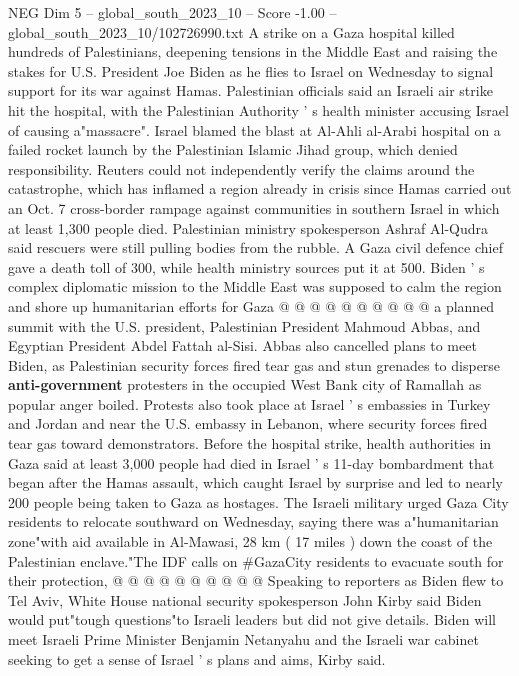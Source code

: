 \begin{textsample}{NEG Dim 5 – global\_south\_2023\_10 – Score -1.00 – global\_south\_2023\_10/102726990.txt}  \label{ex:f5_neg_065}
A strike on a Gaza hospital killed hundreds of Palestinians, deepening tensions in the Middle East and raising the stakes for U.S.
President Joe Biden as he flies to Israel on Wednesday to signal support for its war against Hamas.
Palestinian officials said an Israeli air strike hit the hospital, with the Palestinian Authority ' s health minister accusing Israel of causing a"massacre".
Israel blamed the blast at Al-Ahli al-Arabi hospital on a failed rocket launch by the Palestinian Islamic Jihad group, which denied responsibility.
Reuters could not independently verify the claims around the catastrophe, which has inflamed a region already in crisis since Hamas carried out an Oct. 7 cross-border rampage against communities in southern Israel in which at least 1,300 people died.
Palestinian ministry spokesperson Ashraf Al-Qudra said rescuers were still pulling bodies from the rubble.
A Gaza civil defence chief gave a death toll of 300, while health ministry sources put it at 500.
Biden ' s complex diplomatic mission to the Middle East was supposed to calm the region and shore up humanitarian efforts for Gaza @ @ @ @ @ @ @ @ @ @ a planned summit with the U.S. president, Palestinian President Mahmoud Abbas, and Egyptian President Abdel Fattah al-Sisi.
Abbas also cancelled plans to meet Biden, as Palestinian security forces fired tear gas and stun grenades to disperse \textbf{anti-government} protesters in the occupied West Bank city of Ramallah as popular anger boiled.
Protests also took place at Israel ' s embassies in Turkey and Jordan and near the U.S. embassy in Lebanon, where security forces fired tear gas toward demonstrators.
Before the hospital strike, health authorities in Gaza said at least 3,000 people had died in Israel ' s 11-day bombardment that began after the Hamas assault, which caught Israel by surprise and led to nearly 200 people being taken to Gaza as hostages.
The Israeli military urged Gaza City residents to relocate southward on Wednesday, saying there was a"humanitarian zone"with aid available in Al-Mawasi, 28 km ( 17 miles ) down the coast of the Palestinian enclave."The IDF calls on \#GazaCity residents to evacuate south for their protection, @ @ @ @ @ @ @ @ @ @ Speaking to reporters as Biden flew to Tel Aviv, White House national security spokesperson John Kirby said Biden would put"tough questions"to Israeli leaders but did not give details.
Biden will meet Israeli Prime Minister Benjamin Netanyahu and the Israeli war cabinet seeking to get a sense of Israel ' s plans and aims, Kirby said.

\end{textsample}
